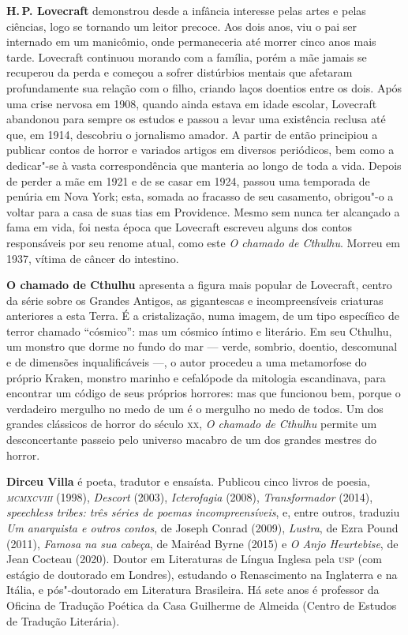 \textbf{H.\,P. Lovecraft} demonstrou desde a infância interesse pelas artes e
pelas ciências, logo se tornando um leitor precoce. Aos dois anos, viu o pai ser internado em um manicômio, onde permaneceria até
morrer cinco anos mais tarde. Lovecraft continuou morando com a família,
porém a mãe jamais se recuperou da perda e começou a sofrer 
distúrbios mentais que afetaram profundamente sua relação com o filho,
criando laços doentios entre os dois. Após uma crise nervosa em 1908,
quando ainda estava em idade escolar, Lovecraft abandonou para sempre os
estudos e passou a levar uma existência reclusa até que, em 1914,
descobriu o jornalismo amador. A partir de então principiou a publicar
contos de horror e variados artigos em diversos periódicos, bem como a dedicar"-se à vasta
correspondência que manteria ao longo de toda a vida.
Depois de perder a mãe em 1921 e de se casar em 1924, passou uma temporada
de penúria em Nova York; esta, somada ao fracasso de seu casamento,
obrigou"-o a voltar para a casa de suas tias em Providence.
Mesmo sem nunca ter alcançado a fama em vida, foi nesta época que
Lovecraft escreveu alguns dos contos responsáveis por seu renome atual,
como este \emph{O chamado de Cthulhu}.
Morreu em 1937, vítima de câncer do intestino.

\textbf{O chamado de Cthulhu} apresenta a figura mais popular de Lovecraft, centro da série sobre os Grandes Antigos, as gigantescas e incompreensíveis criaturas anteriores a esta Terra. É a cristalização, numa imagem, de um tipo específico de terror chamado ``cósmico'': mas um cósmico íntimo e literário. Em seu Cthulhu, um monstro que dorme no fundo do mar --- verde, sombrio, doentio, descomunal e de dimensões inqualificáveis ---, o autor procedeu a uma metamorfose do próprio Kraken, monstro marinho e cefalópode da mitologia escandinava, para encontrar um código de seus próprios horrores: mas que funcionou bem, porque o verdadeiro mergulho no medo de um é o mergulho no medo de todos. Um dos grandes clássicos de horror do século \textsc{xx}, \textit{O chamado de Cthulhu} permite um desconcertante passeio pelo universo macabro de um dos grandes mestres do horror.

 
\textbf{Dirceu Villa} é poeta, tradutor e ensaísta. Publicou cinco livros de poesia, \emph{\textsc{mcmxcviii}} (1998), \emph{Descort} (2003), \emph{Icterofagia} (2008), \emph{Transformador} (2014), \emph{speechless tribes: três séries de poemas incompreensíveis}, e, entre outros, traduziu \emph{Um anarquista e outros contos}, de Joseph Conrad (2009), \emph{Lustra}, de Ezra Pound (2011), \emph{Famosa na sua cabeça}, de Mairéad Byrne (2015) e \emph{O Anjo Heurtebise}, de Jean Cocteau (2020). Doutor em Literaturas de Língua Inglesa pela \textsc{usp} (com estágio de doutorado em Londres), estudando o Renascimento na Inglaterra e na Itália, e pós"-doutorado em Literatura Brasileira. Há sete anos é professor da Oficina de Tradução Poética da Casa Guilherme de Almeida (Centro de Estudos de Tradução Literária).

